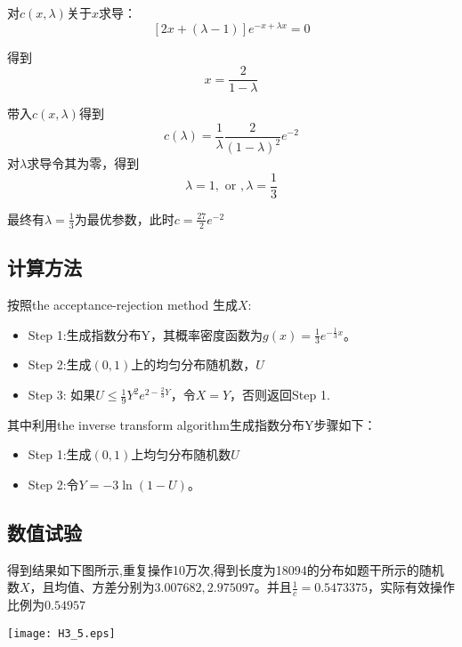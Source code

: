 \documentclass{ctexart}
\begin{document}
对\(c(x,\lambda)\)关于\(x\)求导：
\[
[2x+(\lambda-1)]e^{-x+\lambda x}=0 
\]

得到
\[
x=\frac{2}{1-\lambda}
\]

带入\(c(x,\lambda)\)得到
\[c(\lambda)=\frac{1}{\lambda}\frac{2}{(1-\lambda)^2}e^{-2}
\]
对\(\lambda\)求导令其为零，得到
\[
\lambda=1,\mbox{  or  },\lambda=\frac{1}{3}
\]

最终有\(\lambda= \frac{1}{3}\)为最优参数，此时\(c=\frac{27}{2}e^{-2}\)

\subsection{计算方法}
按照the acceptance-rejection method 生成\(X\):

\begin{itemize} 
\item Step 1:生成指数分布Y，其概率密度函数为\(g(x)=\frac{1}{3} e^{-\frac{1}{3} x}\)。
\item Step 2:生成\((0,1)\)上的均匀分布随机数，\(U\)
\item Step 3: 如果\(U \leq \frac{1}{9} Y^2 e^{2-\frac{2}{3}Y}\)，令\(X=Y\)，否则返回Step 1.
\end{itemize}

其中利用the inverse transform algorithm生成指数分布Y步骤如下：
\begin{itemize} 
\item Step 1:生成\((0,1)\)上均匀分布随机数\(U\) 
\item Step 2:令\(Y = -3 \ln(1-U)\)。
\end{itemize}


\subsection{数值试验}

得到结果如下图所示,重复操作10万次,得到长度为18094的分布如题干所示的随机数\(X\)，且均值、方差分别为\(3.007682,2.975097 \)。并且\(\frac{1}{c}=0.5473375\)，实际有效操作比例为\(0.54957\)

\centerline{\texttt{[image: H3\_5.eps]}}
\end{document}
